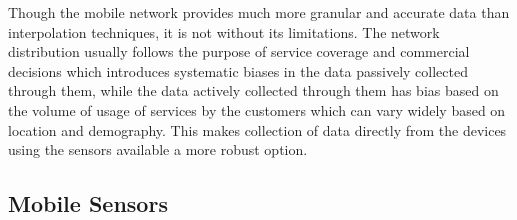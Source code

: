 Though the mobile network provides much more granular and accurate data than interpolation techniques, it is not without its limitations.
The network distribution usually follows the purpose of service coverage and commercial decisions which introduces systematic biases in the data passively collected through them, while the data actively collected through them has bias based on the volume of usage of services by the customers which can vary widely based on location and demography.
This makes collection of data directly from the devices using the sensors available a more robust option.

\subsection{Mobile Sensors}

